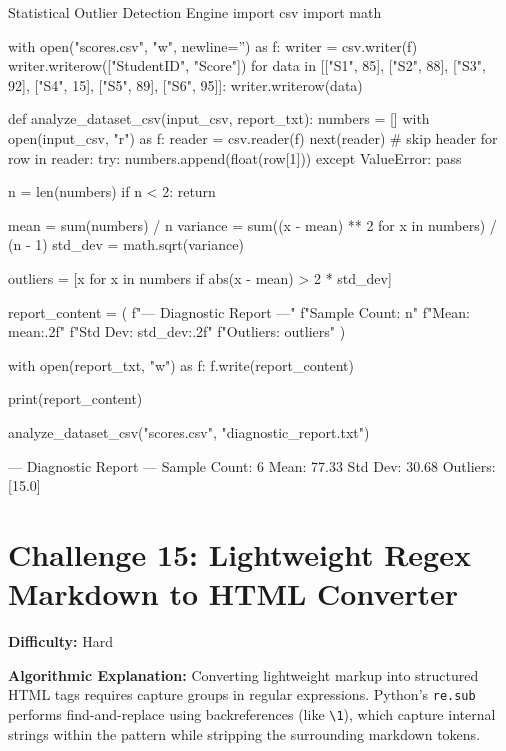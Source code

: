 \begin{pythoncode}{Statistical Outlier Detection Engine}
import csv
import math

with open("scores.csv", "w", newline='') as f:
    writer = csv.writer(f)
    writer.writerow(["StudentID", "Score"])
    for data in [["S1", 85], ["S2", 88], ["S3", 92], ["S4", 15], ["S5", 89], ["S6", 95]]:
        writer.writerow(data)

def analyze_dataset_csv(input_csv, report_txt):
    numbers = []
    with open(input_csv, "r") as f:
        reader = csv.reader(f)
        next(reader) # skip header
        for row in reader:
            try:
                numbers.append(float(row[1]))
            except ValueError:
                pass
                
    n = len(numbers)
    if n < 2: return
    
    mean = sum(numbers) / n
    variance = sum((x - mean) ** 2 for x in numbers) / (n - 1)
    std_dev = math.sqrt(variance)
    
    outliers = [x for x in numbers if abs(x - mean) > 2 * std_dev]
    
    report_content = (
        f"--- Diagnostic Report ---\n"
        f"Sample Count: {n}\n"
        f"Mean:         {mean:.2f}\n"
        f"Std Dev:      {std_dev:.2f}\n"
        f"Outliers:     {outliers}\n"
    )
    
    with open(report_txt, "w") as f:
        f.write(report_content)
        
    print(report_content)

analyze_dataset_csv("scores.csv", "diagnostic_report.txt")
\end{pythoncode}

\begin{outputbox}
--- Diagnostic Report ---
Sample Count: 6
Mean:         77.33
Std Dev:      30.68
Outliers:     [15.0]
\end{outputbox}

\section{Challenge 15: Lightweight Regex Markdown to HTML Converter}

\textbf{Difficulty:} Hard

\textbf{Algorithmic Explanation:}
Converting lightweight markup into structured HTML tags requires capture groups in regular expressions. Python's \texttt{re.sub} performs find-and-replace using backreferences (like \texttt{\textbackslash 1}), which capture internal strings within the pattern while stripping the surrounding markdown tokens.

